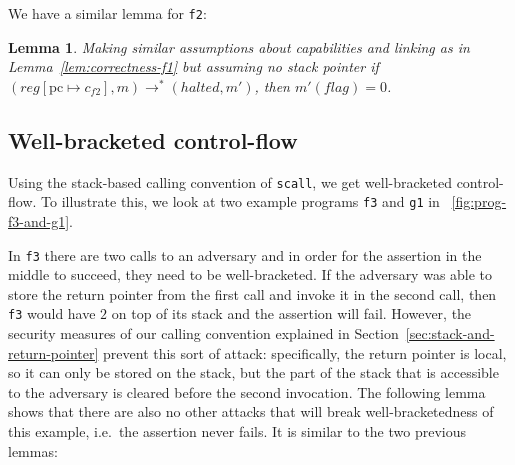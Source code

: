 \documentclass[compsoc,conference,letterpaper,fleqn]{IEEEtran}
\newtheorem{lemma}{Lemma}
\newcommand{\update}[2]{[#1 \mapsto #2]}
\newcommand{\var}[1]{\mathit{#1}}
\newcommand{\pcreg}{\mathrm{pc}}
\newcommand{\reg}{\var{reg}}
\newcommand{\flag}{\var{flag}}
\newcommand{\halted}{\mathit{halted}}
\newcommand{\step}[1][]{\rightarrow_{#1}}
\begin{document}
We have a similar lemma for \texttt{\footnotesize{f2}}:
\begin{lemma}
  \label{lem:correctness-f2}
  Making similar assumptions about capabilities and linking as in
  Lemma~\ref{lem:correctness-f1} but assuming no stack pointer
  if $(\reg\update{\pcreg}{c_{f2}},m) \step^* (\halted,m')$, then $m'(\flag) = 0$.
\end{lemma}

\subsection{Well-bracketed control-flow} 
Using the stack-based calling convention of \texttt{\footnotesize{scall}}, we get
well-bracketed control-flow. To illustrate this, we look at
two example programs \texttt{\footnotesize{f3}} and
\texttt{\footnotesize{g1}} in \figurename~\ref{fig:prog-f3-and-g1}.

In \texttt{\footnotesize{f3}} there are two calls to an adversary and in order for the
assertion in the middle to succeed, they need to be well-bracketed. If the
adversary was able to store the return pointer from the first call and invoke
it in the second call, then \texttt{\footnotesize{f3}} would have $2$ on top of its stack and
the assertion will fail. However, the security measures of our calling
convention explained in Section~\ref{sec:stack-and-return-pointer} prevent this
sort of attack: specifically, the return pointer is local, so it can only be
stored on the stack, but the part of the stack that is accessible to the
adversary is cleared before the second invocation. The following lemma shows
that there are also no other attacks that will break well-bracketedness of this
example, i.e.\ the assertion never fails. It is similar to the two previous
lemmas:
\end{document}
